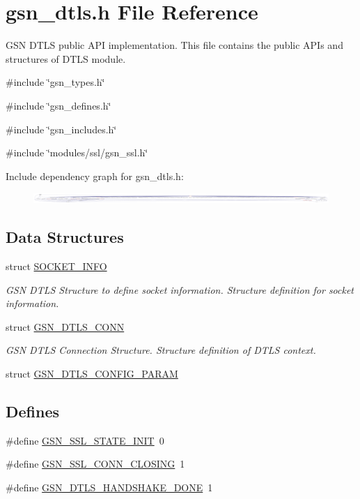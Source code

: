 \hypertarget{a00487}{
\section{gsn\_\-dtls.h File Reference}
\label{a00487}
}


GSN DTLS public API implementation. This file contains the public APIs and structures of DTLS module.  


{\ttfamily \#include \char`\"{}gsn\_\-types.h\char`\"{}}\par
{\ttfamily \#include \char`\"{}gsn\_\-defines.h\char`\"{}}\par
{\ttfamily \#include \char`\"{}gsn\_\-includes.h\char`\"{}}\par
{\ttfamily \#include \char`\"{}modules/ssl/gsn\_\-ssl.h\char`\"{}}\par
Include dependency graph for gsn\_\-dtls.h:
\nopagebreak
\begin{figure}[H]
\begin{center}
\leavevmode
\includegraphics[width=400pt]{a00717}
\end{center}
\end{figure}
\subsection*{Data Structures}
\begin{DoxyCompactItemize}
\item 
struct \hyperlink{a00460}{SOCKET\_\-INFO}
\begin{DoxyCompactList}\small\item\em GSN DTLS Structure to define socket information. Structure definition for socket information. \end{DoxyCompactList}\item 
struct \hyperlink{a00057}{GSN\_\-DTLS\_\-CONN}
\begin{DoxyCompactList}\small\item\em GSN DTLS Connection Structure. Structure definition of DTLS context. \end{DoxyCompactList}\item 
struct \hyperlink{a00056}{GSN\_\-DTLS\_\-CONFIG\_\-PARAM}
\end{DoxyCompactItemize}
\subsection*{Defines}
\begin{DoxyCompactItemize}
\item 
\#define \hyperlink{a00487_ab67365eb248a84bc175c126841099a48}{GSN\_\-SSL\_\-STATE\_\-INIT}~0
\item 
\#define \hyperlink{a00487_a4a58c10b1fe6239becbe4c24ace70aef}{GSN\_\-SSL\_\-CONN\_\-CLOSING}~1
\item 
\#define \hyperlink{a00487_a39e3d43d3d0cb8d8acafb3d7e30faa57}{GSN\_\-DTLS\_\-HANDSHAKE\_\-DONE}~1
\end{DoxyCompactItemize}
